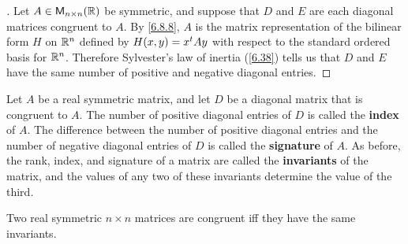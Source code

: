 \begin{proof}[]
  Let \(A \in \ms[n][n][\R]\) be symmetric, and suppose that \(D\) and \(E\) are each diagonal matrices congruent to \(A\).
  By \cref{6.8.8}, \(A\) is the matrix representation of the bilinear form \(H\) on \(\mathbb{R}^n\) defined by \(H(x, y) = {x}^{t} A y\) with respect to the standard ordered basis for \(\mathbb{R}^n\).
  Therefore Sylvester's law of inertia (\cref{6.38}) tells us that \(D\) and \(E\) have the same number of positive and negative diagonal entries.
\end{proof}

\begin{defn}\label{6.8.27}
  Let \(A\) be a real symmetric matrix, and let \(D\) be a diagonal matrix that is congruent to \(A\).
  The number of positive diagonal entries of \(D\) is called the \textbf{index} of \(A\).
  The difference between the number of positive diagonal entries and the number of negative diagonal entries of \(D\) is called the \textbf{signature} of \(A\).
  As before, the rank, index, and signature of a matrix are called the \textbf{invariants} of the matrix, and the values of any two of these invariants determine the value of the third.
\end{defn}

\begin{cor}\label{6.8.28}
  Two real symmetric \(n \times n\) matrices are congruent iff they have the same invariants.
\end{cor}

